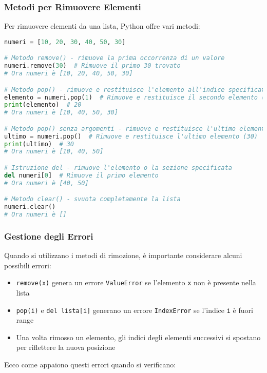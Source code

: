 \subsubsection{Metodi per Rimuovere Elementi}\label{MetodiListeRemove}

Per rimuovere elementi da una lista, Python offre vari metodi:

\begin{lstlisting}[language=Python]
numeri = [10, 20, 30, 40, 50, 30]

# Metodo remove() - rimuove la prima occorrenza di un valore
numeri.remove(30)  # Rimuove il primo 30 trovato
# Ora numeri è [10, 20, 40, 50, 30]

# Metodo pop() - rimuove e restituisce l'elemento all'indice specificato
elemento = numeri.pop(1)  # Rimuove e restituisce il secondo elemento (20)
print(elemento)  # 20
# Ora numeri è [10, 40, 50, 30]

# Metodo pop() senza argomenti - rimuove e restituisce l'ultimo elemento
ultimo = numeri.pop()  # Rimuove e restituisce l'ultimo elemento (30)
print(ultimo)  # 30
# Ora numeri è [10, 40, 50]

# Istruzione del - rimuove l'elemento o la sezione specificata
del numeri[0]  # Rimuove il primo elemento
# Ora numeri è [40, 50]

# Metodo clear() - svuota completamente la lista
numeri.clear()
# Ora numeri è []
\end{lstlisting}

\subsubsection{Gestione degli Errori}\label{GestioneErroriListeRemove}

Quando si utilizzano i metodi di rimozione, è importante considerare alcuni possibili errori:

\begin{itemize}
    \item \texttt{remove(x)} genera un errore \texttt{ValueError} se l'elemento \texttt{x} non è presente nella lista
    \item \texttt{pop(i)} e \texttt{del lista[i]} generano un errore \texttt{IndexError} se l'indice \texttt{i} è fuori range
    \item Una volta rimosso un elemento, gli indici degli elementi successivi si spostano per riflettere la nuova posizione
\end{itemize}

Ecco come appaiono questi errori quando si verificano:

